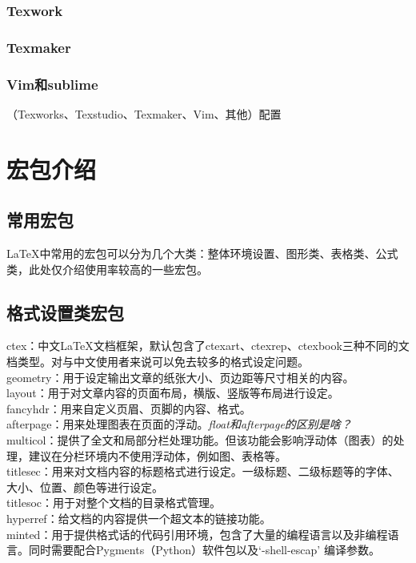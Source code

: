 \documentclass[12pt]{book}
\begin{document}
\subsection{Texwork}

\subsection{Texmaker}

\subsection{Vim和sublime}
（Texworks、Texstudio、Texmaker、Vim、其他）配置

\chapter{宏包介绍}

\section{常用宏包}

\LaTeX{}中常用的宏包可以分为几个大类：整体环境设置、图形类、表格类、公式类，此处仅介绍使用率较高的一些宏包。



\section{格式设置类宏包}


ctex：中文\LaTeX{}文档框架，默认包含了ctexart、ctexrep、ctexbook三种不同的文档类型。对与中文使用者来说可以免去较多的格式设定问题。\\
geometry：用于设定输出文章的纸张大小、页边距等尺寸相关的内容。\\
layout：用于对文章内容的页面布局，横版、竖版等布局进行设定。\\
fancyhdr：用来自定义页眉、页脚的内容、格式。\\
afterpage：用来处理图表在页面的浮动。\textit{float和afterpage的区别是啥？}\\
multicol：提供了全文和局部分栏处理功能。但该功能会影响浮动体（图表）的处理，建议在分栏环境内不使用浮动体，例如图、表格等。\\
titlesec：用来对文档内容的标题格式进行设定。一级标题、二级标题等的字体、大小、位置、颜色等进行设定。\\
titlesoc：用于对整个文档的目录格式管理。\\
hyperref：给文档的内容提供一个超文本的链接功能。\\
minted：用于提供格式话的代码引用环境，包含了大量的编程语言以及非编程语言。同时需要配合Pygments（Python）软件包以及`-shell-escap' 编译参数。
\end{document}
